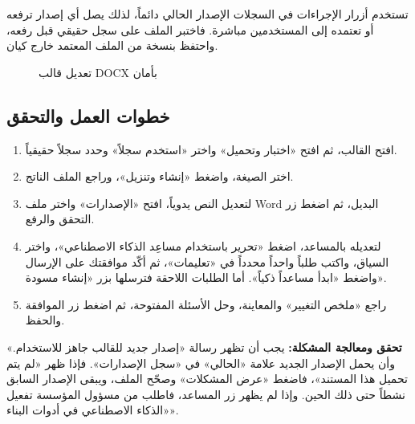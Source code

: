 \begin{rcwarn}
تستخدم أزرار الإجراءات في السجلات الإصدار الحالي دائماً، لذلك يصل أي إصدار ترفعه أو تعتمده إلى المستخدمين مباشرة. فاختبر الملف على سجل حقيقي قبل رفعه، واحتفظ بنسخة من الملف المعتمد خارج كيان.
\end{rcwarn}

\begin{figure}[H]
\centering
{}
\rclegend
\caption{تعديل قالب DOCX بأمان}
\label{fig:builder-docx-workspace-flow}
\end{figure}

\subsection{خطوات العمل والتحقق}
\begin{enumerate}
\item افتح القالب، ثم افتح «اختبار وتحميل» واختر «استخدم سجلاً» وحدد سجلاً حقيقياً.
\item اختر الصيغة، واضغط «إنشاء وتنزيل»، وراجع الملف الناتج.
\item لتعديل النص يدوياً، افتح «الإصدارات» واختر ملف Word البديل، ثم اضغط زر التحقق والرفع.
\item لتعديله بالمساعد، اضغط «تحرير باستخدام مساعِد الذكاء الاصطناعي»، واختر السياق، واكتب طلباً واحداً محدداً في «تعليمات»، ثم أكّد موافقتك على الإرسال واضغط «ابدأ مساعداً ذكياً». أما الطلبات اللاحقة فترسلها بزر «إنشاء مسودة».
\item راجع «ملخص التغيير» والمعاينة، وحل الأسئلة المفتوحة، ثم اضغط زر الموافقة والحفظ.
\end{enumerate}

\textbf{تحقق ومعالجة المشكلة:} يجب أن تظهر رسالة «إصدار جديد للقالب جاهز للاستخدام.» وأن يحمل الإصدار الجديد علامة «الحالي» في «سجل الإصدارات». فإذا ظهر «لم يتم تحميل هذا المستند»، فاضغط «عرض المشكلات» وصحّح الملف، ويبقى الإصدار السابق نشطاً حتى ذلك الحين. وإذا لم يظهر زر المساعد، فاطلب من مسؤول المؤسسة تفعيل «الذكاء الاصطناعي في أدوات البناء».

